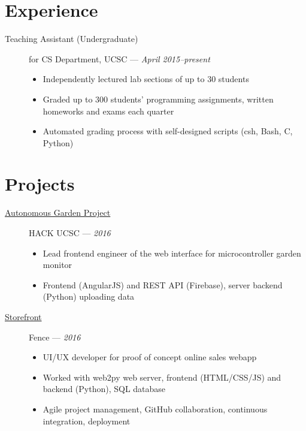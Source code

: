 \documentclass[11pt]{article}
\begin{document}
\section*{Experience}
\begin{description}
  \item[Teaching Assistant (Undergraduate)] for CS Department, UCSC ---
    \textit{April 2015--present}
    \begin{itemize}
      \item Independently lectured lab sections of up to $30$ students
      \item Graded up to $300$ students' programming assignments, written
        homeworks and exams each quarter
      \item Automated grading process with self-designed scripts (csh, Bash, C,
        Python)
    \end{itemize}
\end{description}

\section*{Projects}
\begin{description}
  \item[\href{https://github.com/4U6U57/hackucsc2016.autogarden}{Autonomous
    Garden Project}] HACK UCSC --- \textit{2016}
    \begin{itemize}
      \item Lead frontend engineer of the web interface for microcontroller
        garden monitor
      \item Frontend (AngularJS) and REST API (Firebase), server backend
        (Python) uploading data
    \end{itemize}
  \item[\href{https://github.com/Fence-UCSC/Storefront}{Storefront}]
    Fence --- \textit{2016}
    \begin{itemize}
      \item UI/UX developer for proof of concept online sales webapp
      \item Worked with web2py web server, frontend (HTML/CSS/JS) and backend
        (Python), SQL database
      \item Agile project management, GitHub collaboration, continuous
        integration, deployment
    \end{itemize}
\end{description}
\end{document}
